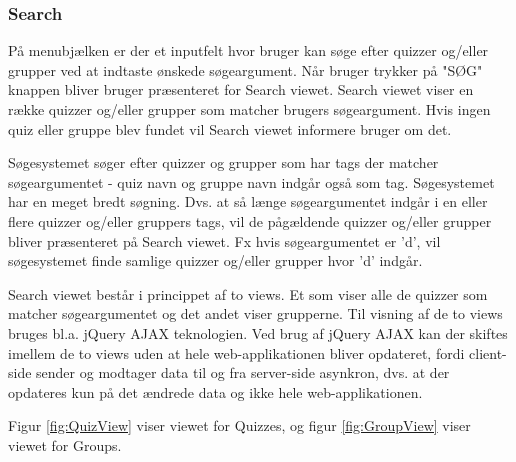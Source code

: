 \subsubsection{Search}

På menubjælken er der et inputfelt hvor bruger kan søge efter quizzer og/eller grupper ved at indtaste ønskede søgeargument. Når bruger trykker på "SØG" knappen bliver bruger præsenteret for Search viewet. Search viewet viser en række quizzer og/eller grupper som matcher brugers søgeargument. Hvis ingen quiz eller gruppe blev fundet vil Search viewet informere bruger om det. 

Søgesystemet søger  efter quizzer og grupper som har tags der matcher søgeargumentet - quiz navn og gruppe navn indgår også som tag. Søgesystemet har en meget bredt søgning. Dvs. at så længe søgeargumentet indgår i en eller flere quizzer og/eller gruppers tags, vil de pågældende quizzer og/eller grupper bliver præsenteret på Search viewet. Fx hvis søgeargumentet er 'd', vil søgesystemet finde samlige quizzer og/eller grupper hvor 'd' indgår.  


Search viewet består i princippet af to views. Et som viser alle de quizzer som matcher søgeargumentet og det andet viser grupperne. Til visning af de to views bruges bl.a. jQuery AJAX teknologien. Ved brug af jQuery AJAX kan der skiftes imellem de to views uden at hele web-applikationen bliver opdateret, fordi client-side sender og modtager data til og fra server-side asynkron, dvs. at der opdateres kun på det ændrede data og ikke hele web-applikationen. 

Figur \ref{fig:QuizView} viser viewet for Quizzes, og figur \ref{fig:GroupView} viser viewet for Groups. 



